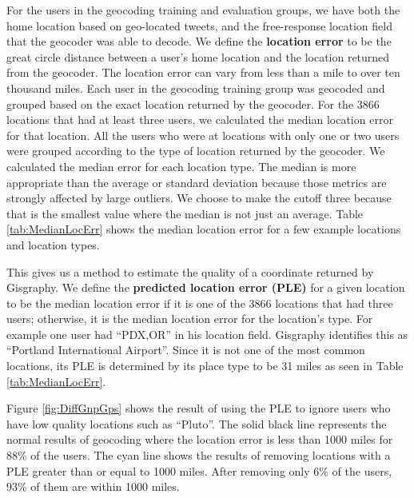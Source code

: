 For the users in the geocoding training and evaluation groups, we have both the
home location based on geo-located tweets, and the free-response location field
that the geocoder was able to decode.
We define the \textbf{location error} to be the great circle distance between a user's home
location and the location returned from the geocoder.
The location error can vary from less than a mile to over ten thousand miles.
Each user in the geocoding training group was geocoded and grouped based on the exact location returned by the geocoder.
For the 3866 locations that had at least three users, we calculated the median location error for that location.
All the users who were at locations with only one or two users were grouped
according to the type of location returned by the geocoder.
We calculated the median error for each location type.
The median is more appropriate than the average or standard deviation because
those metrics are strongly affected by large outliers.
We choose to make the cutoff three because that is the smallest value where the median is not just an average.
Table \ref{tab:MedianLocErr} shows the median location error for a few example locations and location types.

This gives us a method to estimate the quality of a coordinate returned by Gisgraphy.
We define the \textbf{predicted location error (PLE)} for a given location to be the
median location error if it is one of the 3866 locations that had three users;
otherwise, it is the median location error for the location's type.
For example one user had ``PDX,OR'' in his location field. Gisgraphy identifies
this as ``Portland International Airport''. Since it is not one of the most
common locations, its PLE is determined by its place type to be 31 miles as
seen in Table \ref{tab:MedianLocErr}.

Figure \ref{fig:DiffGnpGps} shows the result of using the PLE to ignore users
who have low quality locations such as ``Pluto''.
The solid black line represents the normal results of geocoding where the
location error is less than 1000 miles for 88\% of the users.
The cyan line shows the results of removing locations with a PLE greater than
or equal to 1000 miles.
After removing only 6\% of the users, 93\% of them are within 1000 miles.
